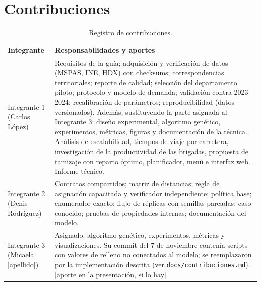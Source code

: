 \documentclass[11pt,letterpaper]{article}
\newcommand{\pend}[1]{\textcolor{red!70!black}{[#1]}}
\newcommand{\cod}[1]{\texttt{#1}}
\begin{document}
\section*{Contribuciones}

\begin{table}[htbp]
\centering
\small
\begin{tabularx}{\textwidth}{>{\raggedright\arraybackslash}p{2.6cm}L}
\toprule
Integrante & Responsabilidades y aportes \\
\midrule
Integrante 1 (Carlos López) & Requisitos de la guía; adquisición y verificación de datos (MSPAS, INE, HDX) con checksums; correspondencias territoriales; reporte de calidad; selección del departamento piloto; protocolo y modelo de demanda; validación contra 2023--2024; recalibración de parámetros; reproducibilidad (datos versionados). Además, sustituyendo la parte asignada al Integrante 3: diseño experimental, algoritmo genético, experimentos, métricas, figuras y documentación de la técnica. Análisis de escalabilidad, tiempos de viaje por carretera, investigación de la productividad de las brigadas, propuesta de tamizaje con reparto óptimo, planificador, menú e interfaz web. Informe técnico. \\
Integrante 2 (Denis Rodríguez) & Contratos compartidos; matriz de distancias; regla de asignación capacitada y verificador independiente; política base; enumerador exacto; flujo de réplicas con semillas pareadas; caso conocido; pruebas de propiedades internas; documentación del modelo. \\
Integrante 3 (Micaela \pend{apellido}) & Asignado: algoritmo genético, experimentos, métricas y visualizaciones. Su commit del 7 de noviembre contenía scripts con valores de relleno no conectados al modelo; se reemplazaron por la implementación descrita (ver \cod{docs/contribuciones.md}). \pend{aporte en la presentación, si lo hay} \\
\bottomrule
\end{tabularx}
\caption{Registro de contribuciones.}
\end{table}
\end{document}

